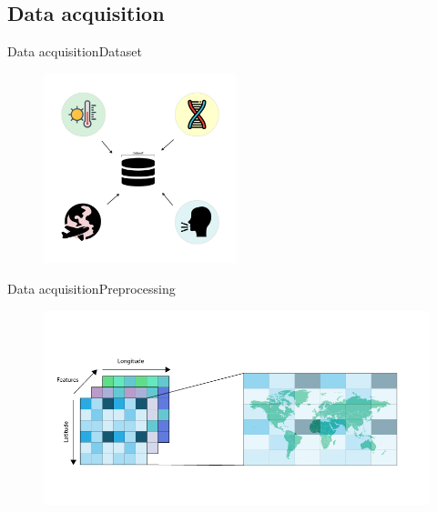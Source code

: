 \documentclass{beamer}
\begin{document}
\subsection*{Data acquisition}
\begin{frame}{Data acquisition}{Dataset}
\begin{figure}[h]
    \centering
    \includegraphics[width=0.5\textwidth]{data-aquisition-1.png}

\end{figure}
\end{frame}


\begin{frame}{Data acquisition}{Preprocessing}
\begin{figure}[h]
    \centering
    \includegraphics[width=\textwidth]{data-aquisition-2.png}
 
\end{figure}
\end{frame}
\end{document}
